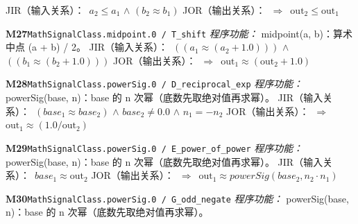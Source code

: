 \documentclass[11pt]{article}
\begin{document}
\hspace*{1.5em}JIR（输入关系）：\ $a_{2}\leq a_{1}$ $\wedge$ $(b_{2} \approx  b_{1})$\newline
\hspace*{1.5em}JOR（输出关系）：\ $\Rightarrow$\ $\mathrm{out}_{2}\leq \mathrm{out}_{1}$\par\medskip
\textbf{M27}\quad \texttt{MathSignalClass.midpoint.0 / T\_shift}\newline
\hspace*{1.5em}\emph{程序功能：} midpoint(a, b)：算术中点 (a + b) / 2。\newline
\hspace*{1.5em}JIR（输入关系）：\ $((a_{1} \approx  (a_{2} + 1.0)))$ $\wedge$ $((b_{1} \approx  (b_{2} + 1.0)))$\newline
\hspace*{1.5em}JOR（输出关系）：\ $\Rightarrow$\ $\mathrm{out}_{1} \approx  (\mathrm{out}_{2} + 1.0)$\par\medskip
\textbf{M28}\quad \texttt{MathSignalClass.powerSig.0 / D\_reciprocal\_exp}\newline
\hspace*{1.5em}\emph{程序功能：} powerSig(base, n)：\textbar{}base\textbar{} 的 n 次幂（底数先取绝对值再求幂）。\newline
\hspace*{1.5em}JIR（输入关系）：\ $(base_{1} \approx  base_{2})$ $\wedge$ $base_{2}\neq 0.0$ $\wedge$ $n_{1} = -n_{2}$\newline
\hspace*{1.5em}JOR（输出关系）：\ $\Rightarrow$\ $\mathrm{out}_{1} \approx  (1.0 / \mathrm{out}_{2})$\par\medskip
\textbf{M29}\quad \texttt{MathSignalClass.powerSig.0 / E\_power\_of\_power}\newline
\hspace*{1.5em}\emph{程序功能：} powerSig(base, n)：\textbar{}base\textbar{} 的 n 次幂（底数先取绝对值再求幂）。\newline
\hspace*{1.5em}JIR（输入关系）：\ $base_{1} \approx  \mathrm{out}_{2}$\newline
\hspace*{1.5em}JOR（输出关系）：\ $\Rightarrow$\ $\mathrm{out}_{1} \approx  powerSig(base_{2}, n_{2}\cdot n_{1})$\par\medskip
\textbf{M30}\quad \texttt{MathSignalClass.powerSig.0 / G\_odd\_negate}\newline
\hspace*{1.5em}\emph{程序功能：} powerSig(base, n)：\textbar{}base\textbar{} 的 n 次幂（底数先取绝对值再求幂）。\newline
\end{document}
